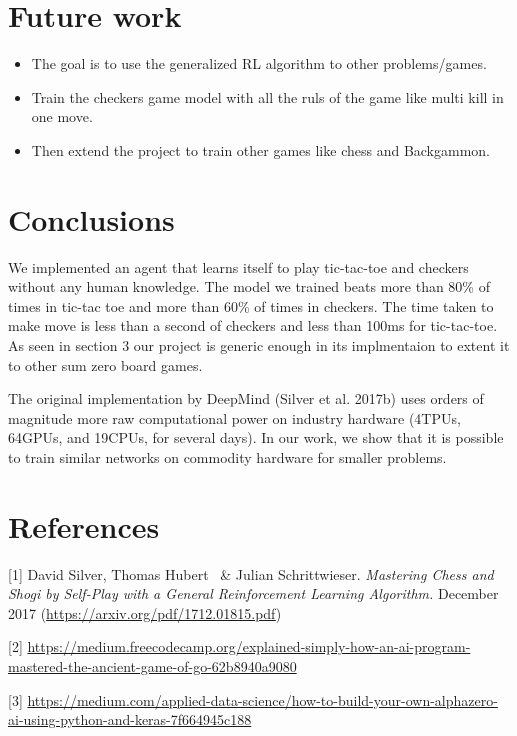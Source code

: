 \documentclass{article}
\begin{document}


\section{Future work}
\begin{itemize}
    \item The goal is to use the generalized RL algorithm to other problems/games.
    \item Train the checkers game model with all the ruls of the game like multi kill in one move.
    \item Then extend the project to train other games like chess and Backgammon.
\end{itemize}

\section{Conclusions}
We implemented an agent that learns itself to play tic-tac-toe and checkers without any human knowledge. The model we trained beats more than 80\% of times in tic-tac toe and more than 60\% of times in checkers. The time taken to make move is less than a second of checkers and less than 100ms for tic-tac-toe. As seen in section 3 our project is generic enough in its implmentaion to extent it to other sum zero board games.

The original implementation by DeepMind (Silver et
al. 2017b) uses orders of magnitude more raw computational
power on industry hardware (4TPUs, 64GPUs,
and 19CPUs, for several days). In our work, we show
that it is possible to train similar networks on commodity
hardware for smaller problems.


\section*{References}

[1] David Silver, Thomas Hubert \ \& Julian Schrittwieser. {\it Mastering Chess and Shogi by      Self-Play with a General Reinforcement Learning Algorithm. } December 2017
    (\url{https://arxiv.org/pdf/1712.01815.pdf})
    
[2] \url{https://medium.freecodecamp.org/explained-simply-how-an-ai-program-mastered-the-ancient-game-of-go-62b8940a9080}

[3] \url{https://medium.com/applied-data-science/how-to-build-your-own-alphazero-ai-using-python-and-keras-7f664945c188}
\end{document}
